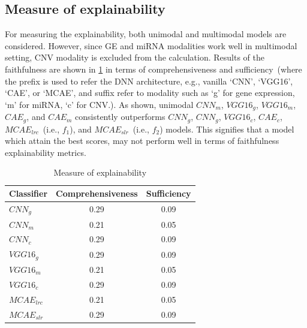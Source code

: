 
\subsection{Measure of explainability}
For measuring the explainability, both unimodal and multimodal models are considered. However, since GE and miRNA modalities work well in multimodal setting, CNV modality is excluded from the calculation. Results of the faithfulness are shown in \cref{tab:faithfullness_result} in terms of comprehensiveness and sufficiency~(where the prefix is used to refer the DNN architecture, e.g., vanilla `CNN', `VGG16', `CAE', or `MCAE', and suffix refer to modality such as `g' for gene expression, `m' for miRNA, `c' for CNV.). As shown, unimodal $CNN_{m}$, $VGG16_{g}$, $VGG16_{m}$, $CAE_{g}$, and $CAE_{m}$ consistently outperforms $CNN_{g}$, $CNN_{g}$, $VGG16_{c}$, $CAE_{c}$, $MCAE_{lrc}$~(i.e., $f_1$), and $MCAE_{slr}$~(i.e., $f_2$) models. This signifies that a model which attain the best scores, %
may not perform well in terms of faithfulness explainability metrics.  

\begin{table}[h]
    \centering
    \caption{Measure of explainability}
    \begin{tabular}{l|c|c}
        \hline \textbf{Classifier} & \textbf{Comprehensiveness} & \textbf{Sufficiency} \\ 
        \hline $CNN_{g}$ & 0.29 & 0.09 \\ \hline 
        $CNN_{m}$ & 0.21 & 0.05 \\
        \hline $CNN_{c}$ & 0.29 & 0.09 \\  
        \hline $VGG16_{g}$ & 0.29 & 0.09 \\ \hline 
        $VGG16_{m}$ & 0.21 & 0.05 \\
        \hline $VGG16_{c}$ & 0.29 & 0.09 \\ \hline 
        $MCAE_{lrc}$ & 0.21 & 0.05 \\
        \hline $MCAE_{slr}$ & 0.29 & 0.09 \\ 
        \hline
    \end{tabular}
    \label{tab:faithfullness_result}
\end{table}

